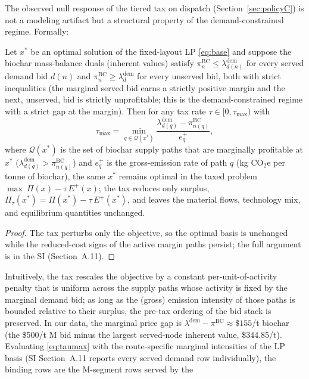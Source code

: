 The observed null response of the tiered tax on dispatch (Section~\ref{sec:policyC})
is not a modeling artifact but a structural property of the demand-constrained
regime. Formally:
\begin{proposition}
\label{prop:taxinv}
Let $x^{*}$ be an optimal solution of the fixed-layout LP \eqref{eq:base} and
suppose the biochar mass-balance duals (inherent values) satisfy
$\pi^{\mathrm{BC}}_{n} \le \lambda^{\mathrm{dem}}_{d(n)}$ for every served
demand bid $d(n)$ and $\pi^{\mathrm{BC}}_{n} \ge
\lambda^{\mathrm{dem}}_{d}$ for every unserved bid, both with strict
inequalities (the marginal served bid earns a strictly positive margin and
the next, unserved, bid is strictly unprofitable; this is the demand-constrained
regime with a strict gap at the margin). Then for any tax rate
$\tau \in [0, \tau_{\max})$ with
\begin{equation}
\label{eq:taumax}
\tau_{\max} =
\min_{q\in\mathcal{Q}(x^{*})}
\frac{\lambda^{\mathrm{dem}}_{d(q)}-\pi^{\mathrm{BC}}_{n(q)}}{e^{+}_q},
\end{equation}
where $\mathcal{Q}(x^{*})$ is the set of biochar supply paths that are
marginally profitable at $x^{*}$
($\lambda^{\mathrm{dem}}_{d(q)}>\pi^{\mathrm{BC}}_{n(q)}$) and $e^{+}_q$ is
the gross-emission rate of path $q$ (kg CO$_2$e per tonne of biochar), the
same $x^{*}$ remains optimal in the taxed problem
$\max\ \Pi(x)-\tau\,E^{+}(x)$; the tax reduces only surplus,
$\Pi_{\tau}(x^{*})=\Pi(x^{*})-\tau\,E^{+}(x^{*})$, and leaves the material
flows, technology mix, and equilibrium quantities unchanged.
\end{proposition}
\begin{proof}
The tax perturbs only the objective, so the optimal basis is unchanged while
the reduced-cost signs of the active margin paths persist; the full argument is
in the SI (Section~A.11).
\end{proof}
Intuitively, the tax rescales the objective by a constant per-unit-of-activity
penalty that is uniform across the supply paths whose activity is fixed by the
marginal demand bid; as long as the (gross) emission intensity of those paths
is bounded relative to their surplus, the pre-tax ordering of the bid stack is
preserved. In our data, the marginal price gap is
$\lambda^{\mathrm{dem}}-\pi^{\mathrm{BC}} \approx \$155$/t
biochar (the \$500/t M bid minus the largest served-node inherent value,
\$344.85/t). Evaluating \eqref{eq:taumax} with the route-specific marginal
intensities of the LP basis (SI Section~A.11 reports every served demand row
individually), the binding rows are the M-segment rows served by the
